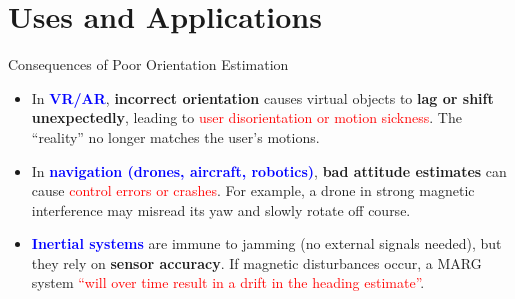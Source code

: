 \documentclass[aspectratio=169,xcolor=dvipsnames]{beamer}
\begin{document}
\section{Uses and Applications}

\begin{frame}{Consequences of Poor Orientation Estimation}
\begin{itemize}[<+->]
  \item In \textcolor{blue}{\textbf{VR/AR}}, \textbf{incorrect orientation} causes virtual objects to \textbf{lag or shift unexpectedly}, leading to \textcolor{red}{user disorientation or motion sickness}. The “reality” no longer matches the user’s motions.
  \item In \textcolor{blue}{\textbf{navigation (drones, aircraft, robotics)}}, \textbf{bad attitude estimates} can cause \textcolor{red}{control errors or crashes}. For example, a drone in strong magnetic interference may misread its yaw and slowly rotate off course.
  \item \textcolor{blue}{\textbf{Inertial systems}} are immune to jamming (no external signals needed), but they rely on \textbf{sensor accuracy}. If magnetic disturbances occur, a MARG system \textcolor{red}{“will over time result in a drift in the heading estimate”}.
\end{itemize}
\end{frame}


\end{document}
